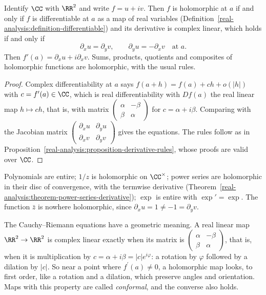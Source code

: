 \begin{proposition}\label{complex-analysis:proposition-cauchy-riemann}
Identify $\CC$ with $\RR^2$ and write $f = u + iv$. Then $f$ is holomorphic at $a$ if and only if $f$ is differentiable at $a$ as a map of real variables
(Definition~\ref{real-analysis:definition-differentiable}) and its derivative is complex linear, which holds if and only if
\[
\partial_xu = \partial_yv, \qquad \partial_yu = -\partial_xv \quad \text{at } a.
\]
Then $f'(a) = \partial_xu + i\partial_xv$. Sums, products, quotients and composites of holomorphic functions are holomorphic, with the usual rules.
\end{proposition}

\begin{proof}
Complex differentiability at $a$ says $f(a + h) = f(a) + ch + o(|h|)$ with $c = f'(a) \in \CC$, which is real differentiability with $Df(a)$ the real linear map $h \mapsto ch$, that is, with matrix
$\left(\begin{smallmatrix} \alpha & -\beta \\ \beta & \alpha \end{smallmatrix}\right)$ for $c = \alpha + i\beta$. Comparing with the Jacobian matrix
$\left(\begin{smallmatrix} \partial_xu & \partial_yu \\ \partial_xv & \partial_yv \end{smallmatrix}\right)$ gives the equations. The rules follow as in
Proposition~\ref{real-analysis:proposition-derivative-rules}, whose proofs are valid over $\CC$.
\end{proof}

\begin{example}\label{complex-analysis:example-holomorphic}
Polynomials are entire; $1/z$ is holomorphic on $\CC^\times$; power series are holomorphic in their disc of convergence, with the termwise derivative
(Theorem~\ref{real-analysis:theorem-power-series-derivative}); $\exp$ is entire with $\exp' = \exp$. The function $\bar z$ is nowhere holomorphic, since $\partial_xu = 1 \neq -1 = \partial_yv$.
\end{example}

The Cauchy--Riemann equations have a geometric meaning. A real linear map $\RR^2 \to \RR^2$ is complex linear exactly when its matrix is
$\left(\begin{smallmatrix} \alpha & -\beta \\ \beta & \alpha \end{smallmatrix}\right)$, that is, when it is multiplication by $c = \alpha + i\beta = |c|e^{i\varphi}$: a rotation by $\varphi$ followed by
a dilation by $|c|$. So near a point where $f^{\prime}(a) \neq 0$, a holomorphic map looks, to first order, like a rotation and a dilation, which preserve angles and orientation. Maps with this property are
called \emph{conformal}, and the converse also holds.

